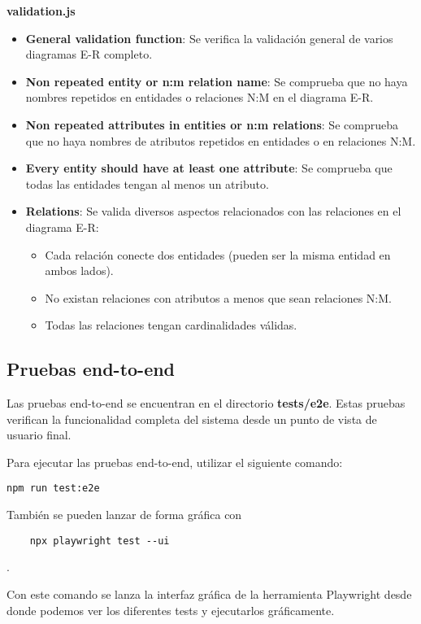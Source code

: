 \textbf{validation.js}
\begin{itemize}
    \item \textbf{General validation function}:
    Se verifica la validación general de varios diagramas E-R completo.

    \item \textbf{Non repeated entity or n:m relation name}:
    Se comprueba que no haya nombres repetidos en entidades o relaciones N:M en el diagrama E-R.

    \item \textbf{Non repeated attributes in entities or n:m relations}:
    Se comprueba que no haya nombres de atributos repetidos en entidades o en relaciones N:M.

    \item \textbf{Every entity should have at least one attribute}:
    Se comprueba que todas las entidades tengan al menos un atributo.

    \item \textbf{Relations}:
    Se valida diversos aspectos relacionados con las relaciones en el diagrama E-R:
    \begin{itemize}
        \item Cada relación conecte dos entidades (pueden ser la misma entidad en ambos lados).
        \item No existan relaciones con atributos a menos que sean relaciones N:M.
        \item Todas las relaciones tengan cardinalidades válidas.
    \end{itemize}
\end{itemize}


\subsection{Pruebas end-to-end}
Las pruebas end-to-end se encuentran en el directorio \textbf{tests/e2e}. Estas pruebas verifican la funcionalidad completa del sistema desde un punto de vista de usuario final.

Para ejecutar las pruebas end-to-end, utilizar el siguiente comando:
\begin{verbatim}
npm run test:e2e
\end{verbatim}

También se pueden lanzar de forma gráfica con \begin{verbatim}
    npx playwright test --ui
\end{verbatim}.

Con este comando se lanza la interfaz gráfica de la herramienta Playwright \cite{playwright} desde donde podemos ver los diferentes tests y ejecutarlos gráficamente.

